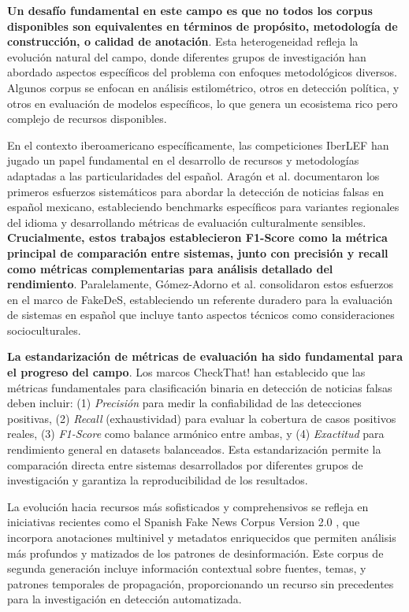 \textbf{Un desafío fundamental en este campo es que no todos los corpus disponibles son equivalentes en términos de propósito, metodología de construcción, o calidad de anotación}. Esta heterogeneidad refleja la evolución natural del campo, donde diferentes grupos de investigación han abordado aspectos específicos del problema con enfoques metodológicos diversos. Algunos corpus se enfocan en análisis estilométrico, otros en detección política, y otros en evaluación de modelos específicos, lo que genera un ecosistema rico pero complejo de recursos disponibles.

En el contexto iberoamericano específicamente, las competiciones IberLEF han jugado un papel fundamental en el desarrollo de recursos y metodologías adaptadas a las particularidades del español. Aragón et al. \cite{aragon2020overview} documentaron los primeros esfuerzos sistemáticos para abordar la detección de noticias falsas en español mexicano, estableciendo benchmarks específicos para variantes regionales del idioma y desarrollando métricas de evaluación culturalmente sensibles. \textbf{Crucialmente, estos trabajos establecieron F1-Score como la métrica principal de comparación entre sistemas, junto con precisión y recall como métricas complementarias para análisis detallado del rendimiento}. Paralelamente, Gómez-Adorno et al. \cite{gomez2021overview} consolidaron estos esfuerzos en el marco de FakeDeS, estableciendo un referente duradero para la evaluación de sistemas en español que incluye tanto aspectos técnicos como consideraciones socioculturales.

\textbf{La estandarización de métricas de evaluación ha sido fundamental para el progreso del campo}. Los marcos CheckThat! \cite{barron2023clef} han establecido que las métricas fundamentales para clasificación binaria en detección de noticias falsas deben incluir: (1) \textit{Precisión} para medir la confiabilidad de las detecciones positivas, (2) \textit{Recall} (exhaustividad) para evaluar la cobertura de casos positivos reales, (3) \textit{F1-Score} como balance armónico entre ambas, y (4) \textit{Exactitud} para rendimiento general en datasets balanceados. Esta estandarización permite la comparación directa entre sistemas desarrollados por diferentes grupos de investigación y garantiza la reproducibilidad de los resultados.

La evolución hacia recursos más sofisticados y comprehensivos se refleja en iniciativas recientes como el Spanish Fake News Corpus Version 2.0 \cite{ramirez2021spanish}, que incorpora anotaciones multinivel y metadatos enriquecidos que permiten análisis más profundos y matizados de los patrones de desinformación. Este corpus de segunda generación incluye información contextual sobre fuentes, temas, y patrones temporales de propagación, proporcionando un recurso sin precedentes para la investigación en detección automatizada.

